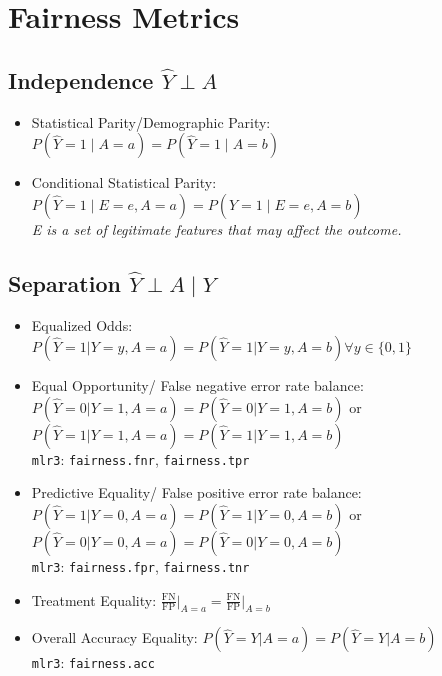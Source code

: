 \documentclass[11pt,a4paper]{article}
\begin{document}
\section{Fairness Metrics \parencite{verma2018}}

\subsection*{Independence $\hat{Y} \perp A$}
\begin{itemize}[leftmargin=2em]
    \item Statistical Parity/Demographic Parity: $P(\hat{Y} = 1 \mid A = a) = P(\hat{Y} = 1 \mid A = b)$
    \item Conditional Statistical Parity: $P(\hat{Y} = 1 \mid E = e, A = a) = P(\hat{Y} = 1 \mid E = e, A = b)$ \\ \textit{E is a set of legitimate features that may affect the outcome.}
\end{itemize}

\subsection*{Separation $\hat{Y} \perp A \mid Y$}
\begin{itemize}[leftmargin=2em]
    \item Equalized Odds: $P(\hat{Y} = 1 | Y = y, A = a) = P(\hat{Y} = 1 | Y = y, A = b) \forall y \in \{0, 1\}$
    \item Equal Opportunity/ False negative error rate balance: $P(\hat{Y} = 0 | Y = 1, A = a) = P(\hat{Y} = 0 | Y = 1, A = b)$ or $P(\hat{Y} = 1 | Y = 1, A = a) = P(\hat{Y} = 1 | Y = 1, A = b)$ \\ \texttt{mlr3}: \texttt{fairness.fnr}, \texttt{fairness.tpr}
    \item Predictive Equality/ False positive error rate balance: $P(\hat{Y} = 1 | Y = 0, A = a) = P(\hat{Y} = 1 | Y = 0, A = b)$ or \\ $P(\hat{Y} = 0 | Y = 0, A = a) = P(\hat{Y} = 0 | Y = 0, A = b)$ \\ \texttt{mlr3}: \texttt{fairness.fpr}, \texttt{fairness.tnr}
    \item Treatment Equality: $\frac{\text{FN}}{\text{FP}} \big|_{A = a} = \frac{\text{FN}}{\text{FP}} \big|_{A = b}$
    \item Overall Accuracy Equality: $P(\hat{Y} = Y | A = a) = P(\hat{Y} = Y | A = b)$ \\ \texttt{mlr3}: \texttt{fairness.acc}
\end{itemize}
\end{document}
